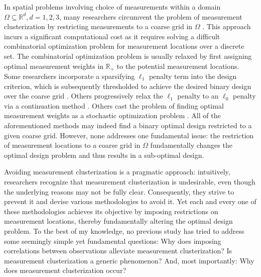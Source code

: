 In spatial problems involving choice of measurements within a domain
\(\Omega \subseteq \mathbb{R}^d, d=1,2,3\), many researchers
circumvent the problem of measurement clusterization by restricting
measurements to a coarse grid in \(\Omega\) \cite{koval2020,
  alexanderian2021, attia2022, alexanderian2014, alexanderian2016,
  alexanderian2018efficient, brunton2016}. This approach incurs a
significant computational cost as it requires solving a difficult
combinatorial optimization problem for measurement locations over a
discrete set. The combinatorial optimization problem is usually
relaxed by first assigning optimal measurement weights in
\(\mathbb{R}_+\) to the potential measurement locations. Some
researchers incorporate a sparsifying \(\ell_1\) penalty term into the
design criterion, which is subsequently thresholded to achieve the
desired binary design over the coarse grid
\cite{horesh2008borehole}. Others progressively relax the \(\ell_1\)
penalty to an \(\ell_0\) penalty via a continuation method
\cite{alexanderian2016, alexanderian2014}. Others cast the problem of
finding optimal measurement weights as a stochastic optimization
problem \cite{attia2022stochastic}. All of the aforementioned methods
may indeed find a binary optimal design restricted to a given coarse
grid. However, none addresses one fundamental issue: the restriction
of measurement locations to a coarse grid in \(\Omega\) fundamentally
changes the optimal design problem and thus results in a sub-optimal
design.

Avoiding measurement clusterization is a pragmatic approach:
intuitively, researchers recognize that measurement clusterization is
undesirable, even though the underlying reasons may not be fully
clear. Consequently, they strive to prevent it and devise various
methodologies to avoid it. Yet each and every one of these
methodologies achieves its objective by imposing restrictions on
measurement locations, thereby fundamentally altering the optimal
design problem. To the best of my knowledge, no previous study has
tried to address some seemingly simple yet fundamental questions:
%
Why does imposing correlations between observations alleviate
measurement clusterization?
%
Is measurement clusterization a generic phenomenon? 
%
And, most importantly: Why does measurement clusterization occur?
%
%


